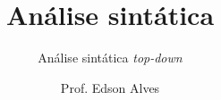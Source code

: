 \title{Análise sintática}
\subtitle{Análise sintática {\it top-down}}
\date{}
\author{Prof. Edson Alves}
